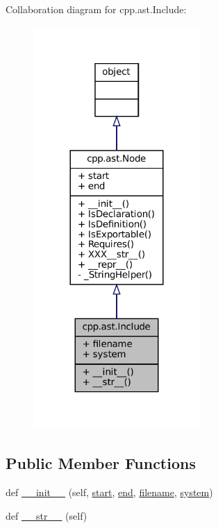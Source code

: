 Collaboration diagram for cpp.\+ast.\+Include\+:
\nopagebreak
\begin{figure}[H]
\begin{center}
\leavevmode
\includegraphics[width=180pt]{classcpp_1_1ast_1_1Include__coll__graph}
\end{center}
\end{figure}
\subsection*{Public Member Functions}
\begin{DoxyCompactItemize}
\item 
def \hyperlink{classcpp_1_1ast_1_1Include_a41b000a9f16a9a1840e56a761bb7045c}{\+\_\+\+\_\+init\+\_\+\+\_\+} (self, \hyperlink{classcpp_1_1ast_1_1Node_a7b2aa97e6a049bb1a93aea48c48f1f44}{start}, \hyperlink{classcpp_1_1ast_1_1Node_a3c5e5246ccf619df28eca02e29d69647}{end}, \hyperlink{classcpp_1_1ast_1_1Include_a9ecff64f127655d3c17e9abe4ebe3852}{filename}, \hyperlink{classcpp_1_1ast_1_1Include_a2e8e535b1af7d9b0ff94d0ae9f86e5c5}{system})
\item 
def \hyperlink{classcpp_1_1ast_1_1Include_ad7d9e5e8f46dcb1a91a282e609412a3e}{\+\_\+\+\_\+str\+\_\+\+\_\+} (self)
\end{DoxyCompactItemize}
